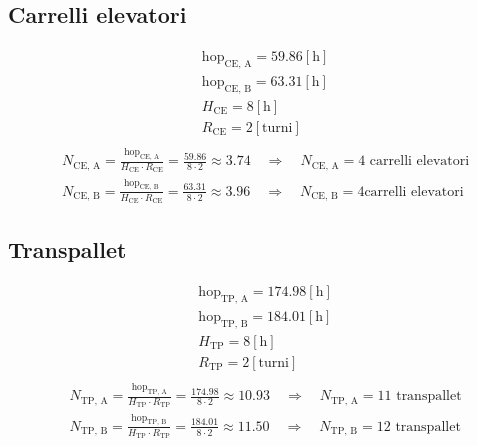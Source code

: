 \documentclass[a4paper,12pt]{article}
\begin{document}
\subsection{Carrelli elevatori}
\begin{align*}
  &\text{hop}_{\text{CE, A}} = 59.86 \left[\mathrm{h}\right] \\
  &\text{hop}_{\text{CE, B}} = 63.31 \left[\mathrm{h}\right] \\
  &H_{\text{CE}} = 8 \left[\mathrm{h}\right] \\
  &R_{\text{CE}} = 2 \left[\mathrm{turni}\right] \\
\end{align*}
\begin{align*}
  &N_{\text{CE, A}} = \frac{\text{hop}_{\text{CE, A}}}{H_{\text{CE}} \cdot R_{\text{CE}}} = \frac{59.86}{8 \cdot 2} \approx 3.74 \quad \Rightarrow \quad N_{\text{CE, A}} = 4 \text{ carrelli elevatori} \\
  &N_{\text{CE, B}} = \frac{\text{hop}_{\text{CE, B}}}{H_{\text{CE}} \cdot R_{\text{CE}}} = \frac{63.31}{8 \cdot 2} \approx 3.96 \quad \Rightarrow \quad N_{\text{CE, B}} = 4 \text{carrelli elevatori}
\end{align*}
\subsection{Transpallet}
\begin{align*}
  &\text{hop}_{\text{TP, A}} = 174.98 \left[\mathrm{h}\right] \\
  &\text{hop}_{\text{TP, B}} = 184.01 \left[\mathrm{h}\right] \\
  &H_{\text{TP}} = 8 \left[\mathrm{h}\right] \\
  &R_{\text{TP}} = 2 \left[\mathrm{turni}\right] \\
\end{align*}
\begin{align*}
  &N_{\text{TP, A}} = \frac{\text{hop}_{\text{TP, A}}}{H_{\text{TP}} \cdot R_{\text{TP}}} = \frac{174.98}{8 \cdot 2} \approx 10.93 \quad \Rightarrow \quad N_{\text{TP, A}} = 11 \text{ transpallet} \\
  &N_{\text{TP, B}} = \frac{\text{hop}_{\text{TP, B}}}{H_{\text{TP}} \cdot R_{\text{TP}}} = \frac{184.01}{8 \cdot 2} \approx 11.50 \quad \Rightarrow \quad N_{\text{TP, B}} = 12 \text{ transpallet}
\end{align*}
\end{document}
